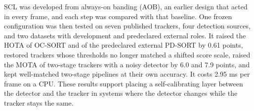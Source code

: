 \documentclass[pdflatex,sn-mathphys-num,iicol]{sn-jnl}
\newcommand{\scl}{SCL}
\newcommand{\aob}{AOB}
\begin{document}
\scl{} was developed from always-on banding (\aob{}), an earlier design that
acted in every frame, and each step was compared with that baseline. One
frozen configuration was then tested on seven published trackers, four
detection sources, and two datasets with development and predeclared
external roles. It raised the HOTA of OC-SORT and of the predeclared
external PD-SORT by 0.61 points, restored trackers whose thresholds no longer
matched a shifted score scale, raised the MOTA of two-stage trackers with a
noisy detector by 6.0 and 7.9 points, and kept well-matched two-stage
pipelines at their own accuracy. It costs 2.95 ms per frame on a CPU. These
results support placing a self-calibrating layer between the detector and
the tracker in systems where the detector changes while the tracker stays
the same.

\backmatter

\end{document}
